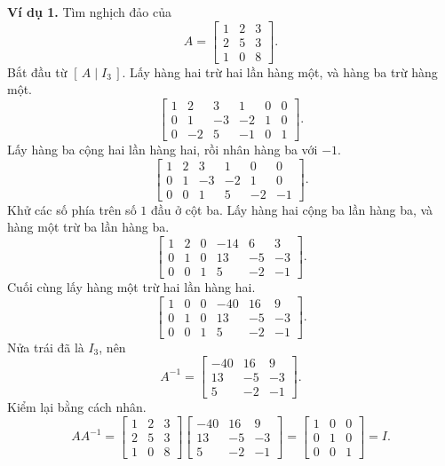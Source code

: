 \documentclass[12pt,a4paper]{article}
\begin{document}
\textbf{Ví dụ 1.} Tìm nghịch đảo của
$$
A=\left[ \begin{array}{rrr} 1 & 2 & 3\\ 2 & 5 & 3\\ 1 & 0 & 8 \end{array} \right].
$$
Bắt đầu từ \([\,A\mid I_3\,]\). Lấy hàng hai trừ hai lần hàng một, và hàng ba trừ hàng một.
$$
\left[ \begin{array}{rrr|rrr} 1 & 2 & 3 & 1 & 0 & 0\\ 0 & 1 & -3 & -2 & 1 & 0\\ 0 & -2 & 5 & -1 & 0 & 1 \end{array} \right].
$$
Lấy hàng ba cộng hai lần hàng hai, rồi nhân hàng ba với \(-1\).
$$
\left[ \begin{array}{rrr|rrr} 1 & 2 & 3 & 1 & 0 & 0\\ 0 & 1 & -3 & -2 & 1 & 0\\ 0 & 0 & 1 & 5 & -2 & -1 \end{array} \right].
$$
Khử các số phía trên số \(1\) đầu ở cột ba. Lấy hàng hai cộng ba lần hàng ba, và hàng một trừ ba lần hàng ba.
$$
\left[ \begin{array}{rrr|rrr} 1 & 2 & 0 & -14 & 6 & 3\\ 0 & 1 & 0 & 13 & -5 & -3\\ 0 & 0 & 1 & 5 & -2 & -1 \end{array} \right].
$$
Cuối cùng lấy hàng một trừ hai lần hàng hai.
$$
\left[ \begin{array}{rrr|rrr} 1 & 0 & 0 & -40 & 16 & 9\\ 0 & 1 & 0 & 13 & -5 & -3\\ 0 & 0 & 1 & 5 & -2 & -1 \end{array} \right].
$$
Nửa trái đã là \(I_3\), nên
$$
A^{-1}=\left[ \begin{array}{rrr} -40 & 16 & 9\\ 13 & -5 & -3\\ 5 & -2 & -1 \end{array} \right].
$$
Kiểm lại bằng cách nhân.
$$
AA^{-1}=\left[ \begin{array}{rrr} 1 & 2 & 3\\ 2 & 5 & 3\\ 1 & 0 & 8 \end{array} \right]\left[ \begin{array}{rrr} -40 & 16 & 9\\ 13 & -5 & -3\\ 5 & -2 & -1 \end{array} \right]=\left[ \begin{array}{rrr} 1 & 0 & 0\\ 0 & 1 & 0\\ 0 & 0 & 1 \end{array} \right]=I.
$$
\end{document}
